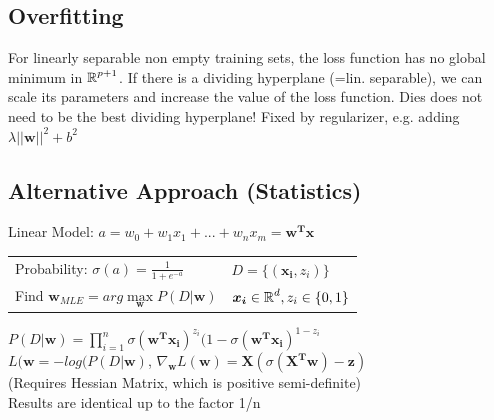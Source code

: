 \documentclass[english]{latex4ei/latex4ei_sheet}
\begin{document}
\begin{sectionbox}
\subsection{Overfitting}
For linearly separable non empty training sets, the loss function has no global minimum in $\operatorname{\mathbb R}^{p+1}$. If there is a dividing hyperplane (=lin. separable), we can scale its parameters and increase the value of the loss function. Dies does not need to be the best dividing hyperplane! Fixed by regularizer, e.g. adding $\lambda||\boldsymbol{w}||^2+b^2$

\subsection{Alternative Approach (Statistics)}
Linear Model: $a = w_0+w_1x_1+...+w_nx_m = \boldsymbol{w^Tx}$\\
\begin{tabular}{ll}
    Probability: $\sigma(a)=\frac{1}{1+e^{-a}}$ & $D=\{(\boldsymbol{x_i},z_i)\}$\\
    Find $\boldsymbol{w}_{MLE}=arg \max\limits_{\boldsymbol{w}} P(D|\boldsymbol{w})$ &  $\boldsymbol{x_i}\in \operatorname{\mathbb R}^d, z_i\in\{0,1\}$\\
\end{tabular}
$P(D|\boldsymbol{w})=\prod\limits_{i=1}^n\sigma(\boldsymbol{w^Tx_i})^{z_i}(1-\sigma(\boldsymbol{w^Tx_i})^{1-z_i}$\\
$L(\boldsymbol{w}=-log(P(D|\boldsymbol{w})$, $\nabla_{\boldsymbol{w}}L(\boldsymbol{w})=\boldsymbol{X}(\sigma(\boldsymbol{X^Tw})-\boldsymbol{z})$\\
(Requires Hessian Matrix, which is positive semi-definite)\\
Results are identical up to the factor 1/n
\end{sectionbox}
\end{document}
